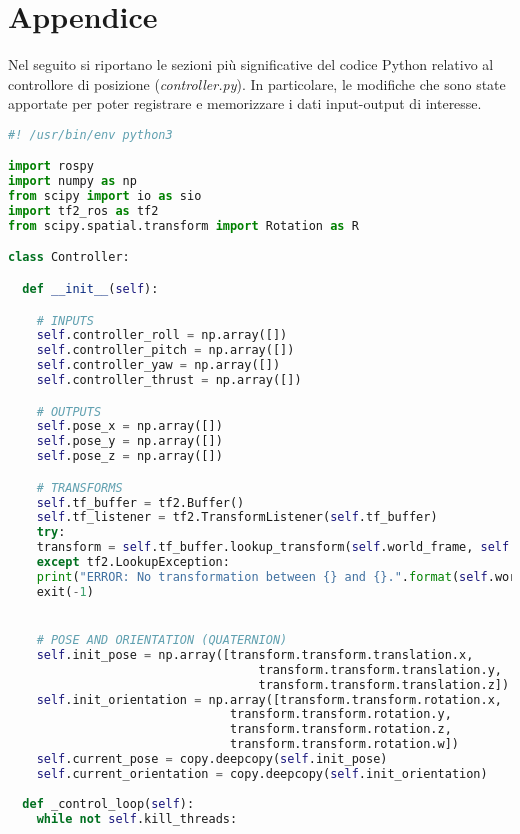 
\chapter*{Appendice}\label{ch:appendix}

Nel seguito si riportano le sezioni più significative del codice Python relativo al controllore di posizione (\emph{controller.py}). In particolare, le modifiche che sono state apportate per poter registrare e memorizzare i dati input-output di interesse.\\

\begin{lstlisting}[language=Python, numbers=none]
#! /usr/bin/env python3

import rospy
import numpy as np
from scipy import io as sio
import tf2_ros as tf2
from scipy.spatial.transform import Rotation as R

class Controller:

  def __init__(self):

    # INPUTS
    self.controller_roll = np.array([])
    self.controller_pitch = np.array([])
    self.controller_yaw = np.array([])
    self.controller_thrust = np.array([])

    # OUTPUTS
    self.pose_x = np.array([])
    self.pose_y = np.array([])
    self.pose_z = np.array([])

    # TRANSFORMS
    self.tf_buffer = tf2.Buffer()
    self.tf_listener = tf2.TransformListener(self.tf_buffer)
    try:
    transform = self.tf_buffer.lookup_transform(self.world_frame, self.drone_frame, rospy.Time(0), rospy.Duration(5))
    except tf2.LookupException:
    print("ERROR: No transformation between {} and {}.".format(self.world_frame, self.drone_frame))
    exit(-1)


    # POSE AND ORIENTATION (QUATERNION)
    self.init_pose = np.array([transform.transform.translation.x,
                                   transform.transform.translation.y,
                                   transform.transform.translation.z])
    self.init_orientation = np.array([transform.transform.rotation.x,
                               transform.transform.rotation.y,
                               transform.transform.rotation.z,
                               transform.transform.rotation.w])
    self.current_pose = copy.deepcopy(self.init_pose)
    self.current_orientation = copy.deepcopy(self.init_orientation)
  
  def _control_loop(self):
    while not self.kill_threads:
    

\end{lstlisting}
